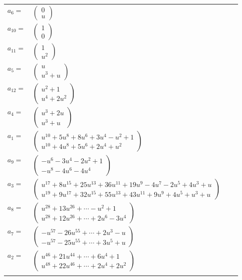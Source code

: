 \documentclass[1p]{elsarticle_modified}
\theoremstyle{definition}
\begin{document}
\begin{tabular}{m{7pt} m{180pt} m{7pt} m{180pt} }
\flushright $a_{6}=$&$\begin{pmatrix}0\\u\end{pmatrix}$ \\
\flushright $a_{10}=$&$\begin{pmatrix}1\\0\end{pmatrix}$ \\
\flushright $a_{11}=$&$\begin{pmatrix}1\\u^2\end{pmatrix}$ \\
\flushright $a_{5}=$&$\begin{pmatrix}u\\u^3+u\end{pmatrix}$ \\
\flushright $a_{12}=$&$\begin{pmatrix}u^2+1\\u^4+2 u^2\end{pmatrix}$ \\
\flushright $a_{4}=$&$\begin{pmatrix}u^3+2 u\\u^3+u\end{pmatrix}$ \\
\flushright $a_{1}=$&$\begin{pmatrix}u^{10}+5 u^8+8 u^6+3 u^4- u^2+1\\u^{10}+4 u^8+5 u^6+2 u^4+u^2\end{pmatrix}$ \\
\flushright $a_{9}=$&$\begin{pmatrix}- u^6-3 u^4-2 u^2+1\\- u^8-4 u^6-4 u^4\end{pmatrix}$ \\
\flushright $a_{3}=$&$\begin{pmatrix}u^{17}+8 u^{15}+25 u^{13}+36 u^{11}+19 u^9-4 u^7-2 u^5+4 u^3+u\\u^{19}+9 u^{17}+32 u^{15}+55 u^{13}+43 u^{11}+9 u^9+4 u^5+u^3+u\end{pmatrix}$ \\
\flushright $a_{8}=$&$\begin{pmatrix}u^{28}+13 u^{26}+\cdots- u^2+1\\u^{28}+12 u^{26}+\cdots+2 u^6-3 u^4\end{pmatrix}$ \\
\flushright $a_{7}=$&$\begin{pmatrix}- u^{57}-26 u^{55}+\cdots+2 u^3- u\\- u^{57}-25 u^{55}+\cdots+3 u^5+u\end{pmatrix}$ \\
\flushright $a_{2}=$&$\begin{pmatrix}u^{46}+21 u^{44}+\cdots+6 u^4+1\\u^{48}+22 u^{46}+\cdots+2 u^4+2 u^2\end{pmatrix}$\\&\end{tabular}
\end{document}
